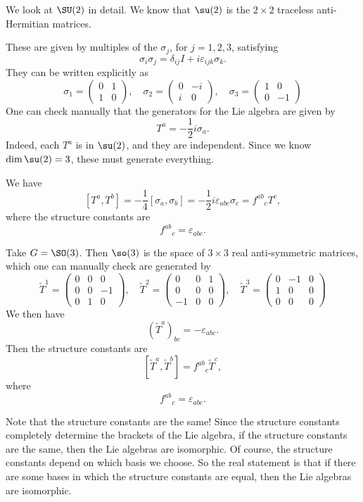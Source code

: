 \documentclass[a4paper]{article}
\begin{document}
\begin{eg}
  We look at $\SU(2)$ in detail. We know that $\su(2)$ is the $2 \times 2$ traceless anti-Hermitian matrices.

  These are given by multiples of the  $\sigma_j$, for $j = 1, 2, 3$, satisfying
  \[
    \sigma_i \sigma_j = \delta_{ij}I + i \varepsilon_{ijk} \sigma_k.
  \]
  They can be written explicitly as
  \[
    \sigma_1 =
    \begin{pmatrix}
      0 & 1\\
      1 & 0
    \end{pmatrix},\quad
    \sigma_2 =
    \begin{pmatrix}
      0 & -i\\
      i & 0
    \end{pmatrix},\quad
    \sigma_3 =
    \begin{pmatrix}
      1 & 0\\
      0 & -1
    \end{pmatrix}
  \]
  One can check manually that the generators for the Lie algebra are given by
  \[
    T^a = -\frac{1}{2} i \sigma_a.
  \]
  Indeed, each $T^a$ is in $\su(2)$, and they are independent. Since we know $\dim \su(2) = 3$, these must generate everything.

  We have
  \[
    [T^a, T^b] = -\frac{1}{4}[\sigma_a, \sigma_b] = -\frac{1}{2} i \varepsilon_{abc} \sigma_c = f^{ab}\!_c T^c,
  \]
  where the structure constants are
  \[
    f^{ab}\!_c = \varepsilon_{abc}.
  \]
\end{eg}

\begin{eg}
  Take $G = \SO(3)$. Then $\so(3)$ is the space of $3 \times 3$ real anti-symmetric matrices, which one can manually check are generated by
  \[
    \tilde{T}^1 =
    \begin{pmatrix}
      0 & 0 & 0\\
      0 & 0 & -1\\
      0 & 1 & 0
    \end{pmatrix},\quad
    \tilde{T}^2 =
    \begin{pmatrix}
      0 & 0 & 1\\
      0 & 0 & 0\\
      -1 & 0 & 0
    \end{pmatrix},\quad
    \tilde{T}^3 =
    \begin{pmatrix}
      0 & -1 & 0\\
      1 & 0 & 0\\
      0 & 0 & 0
    \end{pmatrix}
  \]
  We then have
  \[
    (\tilde{T}^a)_{bc} = -\varepsilon_{abc}.
  \]
  Then the structure constants are
  \[
    [\tilde{T}^a, \tilde{T}^b] = f^{ab}\!_c \tilde{T}^c,
  \]
  where
  \[
    f^{ab}\!_{c} = \varepsilon_{abc}.
  \]
\end{eg}
Note that the structure constants are the same! Since the structure constants completely determine the brackets of the Lie algebra, if the structure constants are the same, then the Lie algebras are isomorphic. Of course, the structure constants depend on which basis we choose. So the real statement is that if there are some bases in which the structure constants are equal, then the Lie algebras are isomorphic.
\end{document}
